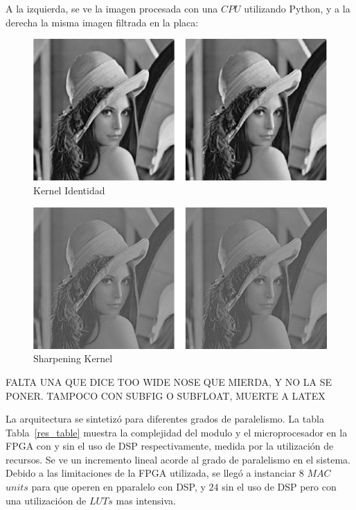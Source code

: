 \documentclass[a4paper]{article}
\begin{document}
A la izquierda, se ve la imagen procesada con una $CPU$ utilizando Python, y a la derecha
la misma imagen filtrada en la placa:


\begin{figure}[H]
\centering
\includegraphics[scale=0.9]{identity_c}
\caption{Kernel Identidad}
\label{identity}
\end{figure}
\begin{figure}[H]
\centering
\includegraphics[scale=0.9]{shaped_c}
\caption{Sharpening Kernel}
\label{sharp}
\end{figure}

FALTA UNA QUE DICE TOO WIDE NOSE QUE MIERDA, Y NO LA SE PONER. TAMPOCO CON SUBFIG O SUBFLOAT, MUERTE A LATEX
\bigskip
\bigskip
\bigskip
\bigskip
\bigskip
\bigskip
\bigskip
\bigskip
\bigskip
\bigskip
\bigskip
\bigskip
\bigskip
\bigskip
\bigskip
\bigskip
\bigskip
\bigskip
\bigskip





La arquitectura se sintetizó para diferentes grados de paralelismo.
La tabla Tabla~\ref{res_table} muestra la complejidad del modulo y el microprocesador en la FPGA
con y sin el uso de DSP respectivamente, medida por la utilización de recursos.
Se ve un incremento lineal acorde al grado de paralelismo en el sistema. Debido a las limitaciones de la FPGA utilizada,
se llegó a instanciar $8$ $MAC$ $units$ para que operen en pparalelo con DSP, y $24$ sin el uso de DSP pero con
una utilizacióon de $LUTs$ mas intensiva.
\end{document}
